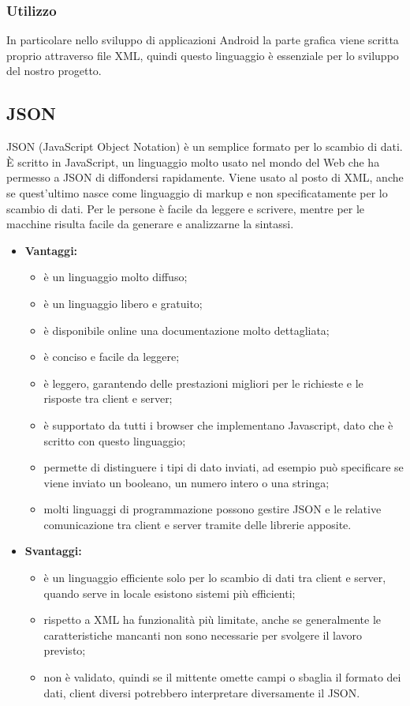 	\subsubsection{Utilizzo}
	In particolare nello sviluppo di applicazioni Android la parte grafica viene scritta proprio attraverso file XML, quindi questo linguaggio è essenziale per lo sviluppo del nostro progetto.
	

\subsection{JSON}
	JSON (JavaScript Object Notation) è un semplice formato per lo scambio di dati. È scritto in JavaScript, un linguaggio molto usato nel mondo del Web che ha permesso a JSON di diffondersi rapidamente. Viene usato al posto di XML, anche se quest'ultimo nasce come linguaggio di markup e non specificatamente per lo scambio di dati. Per le persone è facile da leggere e scrivere, mentre per le macchine risulta facile da generare e analizzarne la sintassi.
	
	\begin{itemize}
		\item \textbf{Vantaggi:}
			\begin{itemize}
				\item è un linguaggio molto diffuso;
				\item è un linguaggio libero e gratuito;
				\item è disponibile online una documentazione molto dettagliata;
				\item è conciso e facile da leggere;
				\item è leggero, garantendo delle prestazioni migliori per le richieste e le risposte tra client e server;
				\item è supportato da tutti i browser che implementano Javascript, dato che è scritto con questo linguaggio;
				\item permette di distinguere i tipi di dato inviati, ad esempio può specificare se viene inviato un booleano, un numero intero o una stringa;
				\item molti linguaggi di programmazione possono gestire JSON e le relative comunicazione tra client e server tramite delle librerie apposite.
			\end{itemize}
		\item \textbf{Svantaggi:}
			\begin{itemize}
				\item è un linguaggio efficiente solo per lo scambio di dati tra client e server, quando serve in locale esistono sistemi più efficienti;
				\item rispetto a XML ha funzionalità più limitate, anche se generalmente le caratteristiche mancanti non sono necessarie per svolgere il lavoro previsto;
				\item non è validato, quindi se il mittente omette campi o sbaglia il formato dei dati, client diversi potrebbero interpretare diversamente il JSON.
			\end{itemize}
	\end{itemize}

